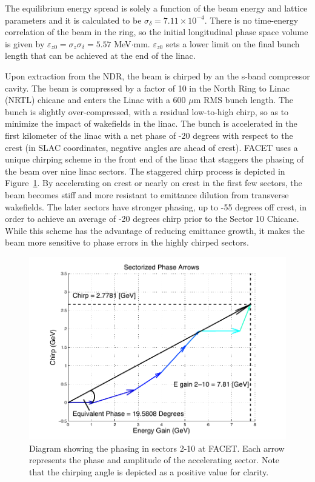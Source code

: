 \documentclass[%
twocolumn,
showpacs,preprintnumbers,
 aps,
prstab,
]{revtex4-1}
\begin{document}
The equilibrium energy spread is solely a function of the beam energy and lattice parameters and it is calculated to be $\sigma_{\delta} = 7.11 \times 10^{-4}$. There is no time-energy correlation of the beam in the ring, so the initial longitudinal phase space volume is given by $\varepsilon_{z0} = \sigma_z \sigma_{\delta} = 5.57$ MeV$\cdot$mm. $\varepsilon_{z0}$ sets a lower limit on the final bunch length that can be achieved at the end of the linac.

Upon extraction from the NDR, the beam is chirped by an the s-band compressor cavity. The beam is compressed by a factor of 10 in the North Ring to Linac (NRTL) chicane and enters the Linac with a 600 $\mu$m RMS bunch length. The bunch is slightly over-compressed, with a residual low-to-high chirp, so as to minimize the impact of wakefields in the linac. The bunch is accelerated in the first kilometer of the linac with a net phase of -20 degrees with respect to the crest (in SLAC coordinates, negative angles are ahead of crest). FACET uses a unique chirping scheme in the front end of the linac that staggers the phasing of the beam over nine linac sectors. The staggered chirp process is depicted in Figure~\ref{stag}. By accelerating on crest or nearly on crest in the first few sectors, the beam becomes stiff and more resistant to emittance dilution from transverse wakefields. The later sectors have stronger phasing, up to -55 degrees off crest, in order to achieve an average of -20 degrees chirp prior to the Sector 10 Chicane. While this scheme has the advantage of reducing emittance growth, it makes the beam more sensitive to phase errors in the highly chirped sectors.

\begin{figure}[hb]
  \includegraphics[width=\columnwidth]{figures/stag.pdf}
  \caption{Diagram showing the phasing in sectors 2-10 at FACET. Each arrow represents the phase and amplitude of the accelerating sector. Note that the chirping angle is depicted as a positive value for clarity.}
  \label{stag}
\end{figure}
\end{document}
